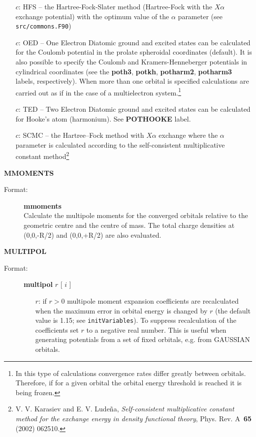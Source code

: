 \documentclass[10pt,a4paper]{article}
\newcommand{\ft}[1]{\texttt{#1}}
\newcommand{\fb}[1]{\textbf{#1}}
\begin{document}
\begin{description}
\begin{description}
\begin{itemize}
\item[$c$:] HFS -- the Hartree-Fock-Slater method (Hartree-Fock with the
  $X\alpha$ exchange potential) with the optimum value of the $\alpha$
  parameter (see \ft{src/commons.F90})

\item[$c$:] OED -- One Electron Diatomic ground and excited states can be
  calculated for the Coulomb potential in the prolate spheroidal
  coordinates (default). It is also possible to specify the Coulomb and
  Kramers-Henneberger potentials in cylindrical coordinates (see the
  \fb{poth3}, \fb{potkh}, \fb{potharm2}, \fb{potharm3} labels,
  respectively). When more than one orbital is specified calculations are
  carried out as if in the case of a multielectron system.\footnote{In this
    type of calculations convergence rates differ greatly between
    orbitals. Therefore, if for a given orbital the orbital energy
    threshold is reached it is being frozen.}

\item[$c$:] TED -- Two Electron Diatomic ground and excited states can be
  calculated for Hooke's atom (harmonium). See \textbf{POTHOOKE} label.

\item[$c$:] SCMC -- the Hartree--Fock method with $X\alpha$ exchange where
  the $\alpha$ parameter is calculated according to the self-consistent
  multiplicative constant method\footnote{V. V. Karasiev and
    E. V. Lude\~{n}a, \textsl{Self-consistent multiplicative constant
      method for the exchange energy in density functional theory},
    Phys. Rev. A~\textbf{65} (2002)
    062510. }

\end{itemize}
\end{description}

\item \textbf{MMOMENTS}
\begin{description}
\item[Format:] \textbf{mmoments} \\
  Calculate the multipole moments for the converged orbitals relative to
  the geometric centre and the centre of mass. The total charge densities at
  (0,0,-R/2) and (0,0,+R/2) are also evaluated.
\end{description}

\item \textbf{MULTIPOL}
\begin{description}
\item[Format:] \textbf{multipol} $r$ [ $i$ ]
\begin{itemize}
\item[$r$:] if $r>0$ multipole moment expansion coefficients are
  recalculated when the maximum error in orbital energy is changed by $r$
  (the default value is 1.15; see \ft{initVariables}). To suppress
  recalculation of the coefficients set $r$ to a negative real number. This
  is useful when generating potentials from a set of fixed orbitals,
  e.g. from GAUSSIAN orbitals.


\end{itemize}
\end{description}
\end{description}
\end{document}
